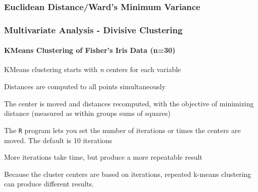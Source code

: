 \documentclass[10pt]{beamer}
\begin{document}
\begin{frame}[fragile]
\frametitle{Euclidean Distance/Ward's Minimum Variance}
\begin{center}
\end{center}
\end{frame}


\begin{frame}
\frametitle{Multivariate Analysis - Divisive Clustering}
\framesubtitle{KMeans Clustering of Fisher's Iris Data (n=30)}

\bi
\item KMeans clustering starts with {\color{blue} {\em n} centers} for each variable
\item Distances are computed to all points simultaneously

\item The center is moved and distances recomputed, with the objective
of minimizing distance (measured as within groups sums of squares)

\item The {\tt \color{red}R} program lets you set the number of iterations
or times the centers are moved.  The default is 10 iterations  
	\bi
	\item More iterations take time, but produce a more repeatable result
	\ei

\item Because the cluster centers are based on iterations, repeated
k-means clustering can produce different results.  
\ei
\end{frame}
\end{document}
